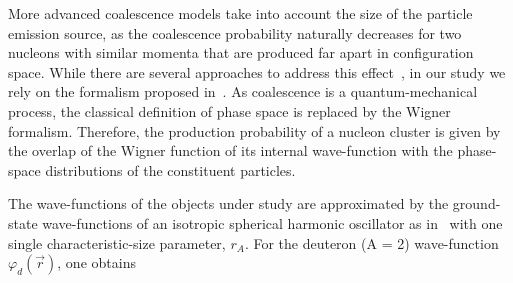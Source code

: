 More advanced coalescence models take into account the size of the particle emission source, as the coalescence probability naturally decreases for two nucleons with similar momenta that are produced far apart in configuration space. While there are several approaches to address this effect~\cite{Sato:1981ez, Nagle:1996vp}, in our study we rely on the formalism proposed in~\cite{Scheibl:1998tk}.
As coalescence is a quantum-mechanical process, the classical definition of phase space is replaced by the Wigner formalism. Therefore, the production probability of a nucleon cluster is given by the overlap of the Wigner function of its internal wave-function with the phase-space distributions of the constituent particles.

The wave-functions of the objects under study are approximated by the ground-state wave-functions of an isotropic spherical harmonic oscillator as in~\cite{Scheibl:1998tk} with one single characteristic-size parameter, $r_{A}$. 
For the deuteron (A = 2) wave-function $\varphi_{d}(\vec{r}) $, one obtains

